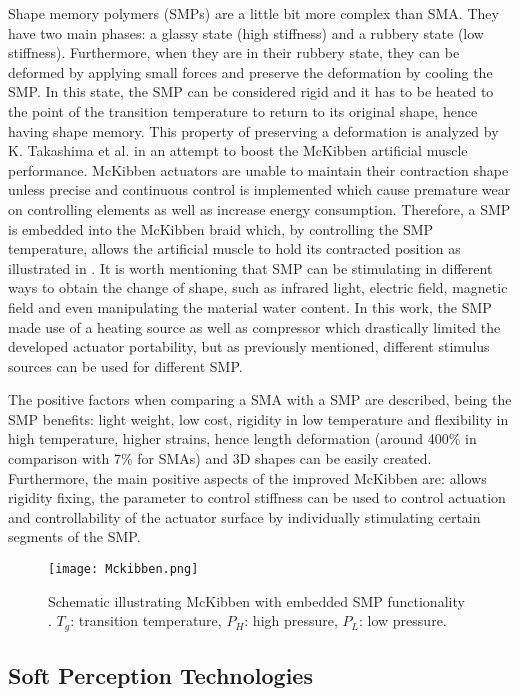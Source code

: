 Shape memory polymers (SMPs) are a little bit more complex than SMA. They have two main phases: a glassy state (high stiffness) and a rubbery state (low stiffness). Furthermore, when they are in their rubbery state, they can be deformed by applying small forces and preserve the deformation by cooling the SMP. In this state, the SMP can be considered rigid and it has to be heated to the point of the transition temperature to return to its original shape, hence having shape memory. This property of preserving a deformation is analyzed by K. Takashima et al. \cite{Takashima2010} in an attempt to boost the McKibben artificial muscle performance. McKibben actuators are unable to maintain their contraction shape unless precise and continuous control is implemented which cause premature wear on controlling elements as well as increase energy consumption. Therefore, a SMP is embedded into the McKibben braid which, by controlling the SMP temperature, allows the artificial muscle to hold its contracted position as illustrated in . It is worth mentioning that SMP can be stimulating in different ways to obtain the change of shape, such as infrared light, electric field, magnetic field and even manipulating the material water content. In this work, the SMP made use of a heating source as well as compressor which drastically limited the developed actuator portability, but as previously mentioned, different stimulus sources can be used for different SMP.

The positive factors when comparing a SMA with a SMP are described, being the SMP benefits: light weight, low cost, rigidity in low temperature and flexibility in high temperature, higher strains, hence length deformation (around 400\% in comparison with 7\% for SMAs) and 3D shapes can be easily created. Furthermore, the main positive aspects of the improved McKibben are: allows rigidity fixing, the parameter to control stiffness can be used to control actuation and controllability of the actuator surface by individually stimulating certain segments of the SMP.

\begin{figure}[hbtp!]
    \centering
    \texttt{[image: Mckibben.png]}
    \caption{Schematic illustrating McKibben with embedded SMP functionality \cite{Takashima2010}. $T_g$: transition temperature, $P_H$: high pressure, $P_L$: low pressure. }
    \label{fig:mckibben}
\end{figure}

\subsection{Soft Perception Technologies}
